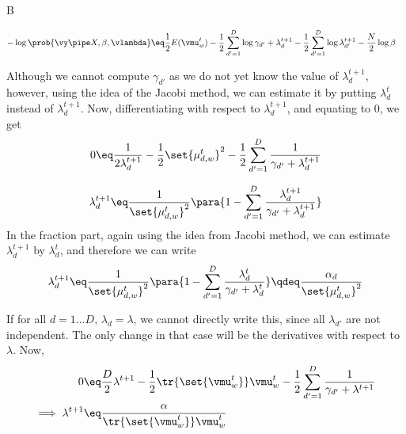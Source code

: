 \documentclass{article}
\begin{document}
\begin{question}
\begin{qpart}{B}

		\begin{align*}
			- \log{\prob{\vy \pipe X, \beta, \vlambda}}	&\eq	\frac{1}{2} E(\vmu_w^t) - \frac{1}{2} \sum_{d' = 1}^D \log{\gamma_{d'} + \lambda_d^{t + 1}} - \frac{1}{2} \sum_{d' = 1}^D \log{\lambda_{d'}^{t + 1}} - \frac{N}{2} \log{\beta}
		\end{align*}

		Although we cannot compute $\gamma_{d'}$ as we do not yet know the value of $\lambda_d^{t + 1}$, however, using the idea of the Jacobi method, we can estimate it by putting $\lambda_d^{t}$ instead of $\lambda_d^{t + 1}$. Now, differentiating with respect to $\lambda_d^{t + 1}$, and equating to 0, we get
		\begin{align*}
			0	\eq	\frac{1}{2 \lambda_d^{t + 1}} - \frac{1}{2} \set{\mu_{d, w}^t}^2 - \frac{1}{2} \sum_{d' = 1}^D \frac{1}{\gamma_{d'} + \lambda_d^{t + 1}}
		\end{align*}


		\begin{align*}
			\lambda_d^{t + 1}	\eq	\frac{1}{\set{\mu_{d, w}^t}^2} \para{1 - \sum_{d' = 1}^D \frac{\lambda_d^{t + 1}}{\gamma_{d'} + \lambda_d^{t + 1}}}
		\end{align*}
		In the fraction part, again using the idea from Jacobi method, we can estimate $\lambda_d^{t + 1}$ by $\lambda_d^t$, and therefore we can write
		\begin{align*}
			\lambda_d^{t + 1}	\eq	\frac{1}{\set{\mu_{d, w}^t}^2} \para{1 - \sum_{d' = 1}^D \frac{\lambda_d^t}{\gamma_{d'} + \lambda_d^t}}	\qdeq	\frac{\alpha_d}{\set{\mu_{d, w}^t}^2}
		\end{align*}

		If for all $d = 1 \dots D$, $\lambda_d = \lambda$, we cannot directly write this, since all $\lambda_{d'}$ are not independent. The only change in that case will be the derivatives with respect to $\lambda$. Now,
		\begin{align*}
			0	&\eq	\frac{D}{2}{\lambda^{t + 1}} - \frac{1}{2} \tr{\set{\vmu_w^t}} \vmu_w^t - \frac{1}{2} \sum_{d' = 1}^D \frac{1}{\gamma_{d'} + \lambda^{t + 1}} \\
			\implies \lambda^{t + 1}	&\eq	\frac{\alpha}{\tr{\set{\vmu_w^t}} \vmu_w^t}
		\end{align*}


\end{qpart}
\end{question}
\end{document}

